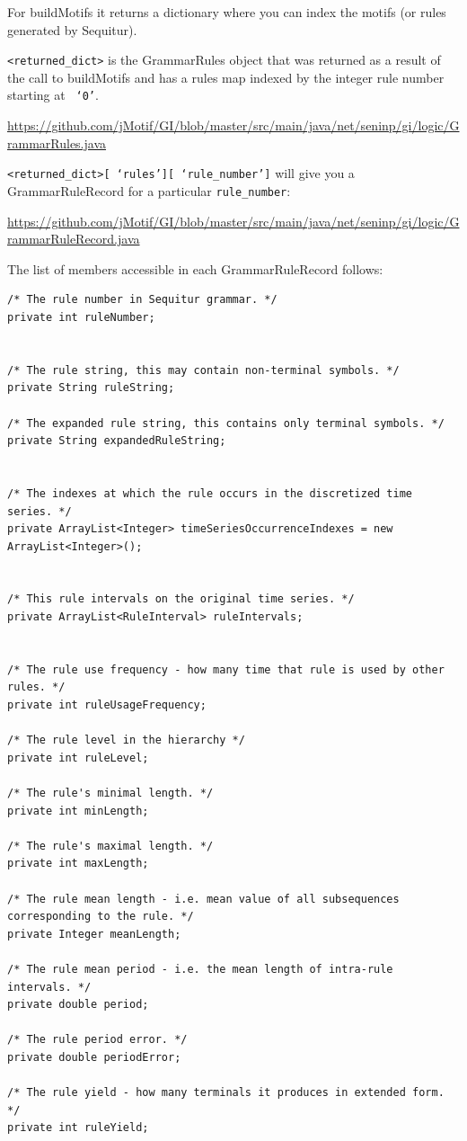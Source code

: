 \documentclass[titlepage, letterpaper, 12pt]{article}
\def\bsq#1{%
	\lq{#1}\rq}
\begin{document}
For buildMotifs it returns a dictionary where you can index the motifs (or rules generated by Sequitur).

\texttt{<returned\_dict>} is the GrammarRules object that was returned as a result of the call to buildMotifs and has a rules map indexed by the integer rule number starting at \texttt{\bsq{0}}.

\small{\url{https://github.com/jMotif/GI/blob/master/src/main/java/net/seninp/gi/logic/GrammarRules.java}}

\texttt{<returned\_dict>[\bsq{rules}][\bsq{rule\_number}]} will give you a GrammarRuleRecord for a particular \texttt{rule\_number}:

\small{\url{https://github.com/jMotif/GI/blob/master/src/main/java/net/seninp/gi/logic/GrammarRuleRecord.java}}

The list of members accessible in each GrammarRuleRecord follows:

\begin{lstlisting}
/* The rule number in Sequitur grammar. */
private int ruleNumber;


/* The rule string, this may contain non-terminal symbols. */
private String ruleString;

/* The expanded rule string, this contains only terminal symbols. */
private String expandedRuleString;


/* The indexes at which the rule occurs in the discretized time series. */
private ArrayList<Integer> timeSeriesOccurrenceIndexes = new ArrayList<Integer>();


/* This rule intervals on the original time series. */
private ArrayList<RuleInterval> ruleIntervals;


/* The rule use frequency - how many time that rule is used by other rules. */
private int ruleUsageFrequency;

/* The rule level in the hierarchy */
private int ruleLevel;

/* The rule's minimal length. */
private int minLength;

/* The rule's maximal length. */
private int maxLength;

/* The rule mean length - i.e. mean value of all subsequences corresponding to the rule. */
private Integer meanLength;

/* The rule mean period - i.e. the mean length of intra-rule intervals. */
private double period;

/* The rule period error. */
private double periodError;

/* The rule yield - how many terminals it produces in extended form. */
private int ruleYield;
\end{lstlisting}
\end{document}
